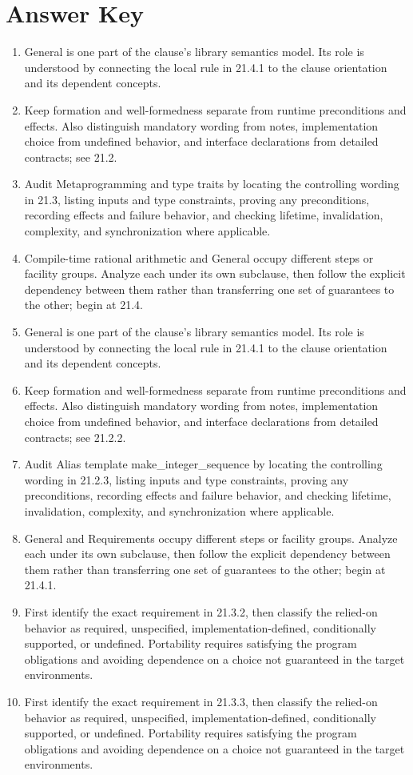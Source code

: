 \documentclass[11pt,letterpaper]{article}
\begin{document}
\clearpage\section{Answer Key}
\begin{enumerate}
\item General is one part of the clause's library semantics model. Its role is understood by connecting the local rule in 21.4.1 to the clause orientation and its dependent concepts.
\item Keep formation and well-formedness separate from runtime preconditions and effects. Also distinguish mandatory wording from notes, implementation choice from undefined behavior, and interface declarations from detailed contracts; see 21.2.
\item Audit Metaprogramming and type traits by locating the controlling wording in 21.3, listing inputs and type constraints, proving any preconditions, recording effects and failure behavior, and checking lifetime, invalidation, complexity, and synchronization where applicable.
\item Compile-time rational arithmetic and General occupy different steps or facility groups. Analyze each under its own subclause, then follow the explicit dependency between them rather than transferring one set of guarantees to the other; begin at 21.4.
\item General is one part of the clause's library semantics model. Its role is understood by connecting the local rule in 21.4.1 to the clause orientation and its dependent concepts.
\item Keep formation and well-formedness separate from runtime preconditions and effects. Also distinguish mandatory wording from notes, implementation choice from undefined behavior, and interface declarations from detailed contracts; see 21.2.2.
\item Audit Alias template make\_\allowbreak{}integer\_\allowbreak{}sequence by locating the controlling wording in 21.2.3, listing inputs and type constraints, proving any preconditions, recording effects and failure behavior, and checking lifetime, invalidation, complexity, and synchronization where applicable.
\item General and Requirements occupy different steps or facility groups. Analyze each under its own subclause, then follow the explicit dependency between them rather than transferring one set of guarantees to the other; begin at 21.4.1.
\item First identify the exact requirement in 21.3.2, then classify the relied-on behavior as required, unspecified, implementation-defined, conditionally supported, or undefined. Portability requires satisfying the program obligations and avoiding dependence on a choice not guaranteed in the target environments.
\item First identify the exact requirement in 21.3.3, then classify the relied-on behavior as required, unspecified, implementation-defined, conditionally supported, or undefined. Portability requires satisfying the program obligations and avoiding dependence on a choice not guaranteed in the target environments.
\end{enumerate}
\end{document}
